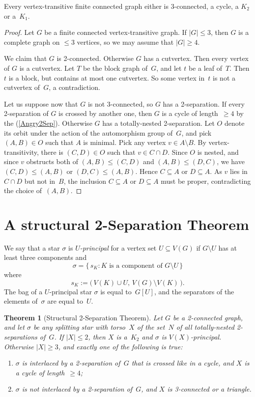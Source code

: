 \documentclass{aic}
\newcommand{\se}{\subseteq}
\theoremstyle{plain}
\newtheorem{thm}{Theorem}[section]
\theoremstyle{definition}
\theoremstyle{plain}
\theoremstyle{plain}
\newcommand{\sm}{\setminus}
\renewcommand{\le}{\leqslant}
\renewcommand{\ge}{\geqslant}
\begin{document}
\begin{cor}\cite[Theorem~3]{infiniteSPQR}\label{CayleyCase2}
Every vertex-transitive finite connected  graph either is 3-connected, a cycle, a $K_2$ or a~$K_1$.
\end{cor}
\begin{proof}
Let $G$ be a finite connected vertex-transitive graph.
If $|G|\le 3$, then $G$ is a complete graph on $\le 3$ vertices, so we may assume that $|G|\ge 4$.

We claim that $G$ is 2-connected.
Otherwise $G$ has a cutvertex.
Then every vertex of $G$ is a cutvertex.
Let $T$ be the block graph of~$G$, and let $t$ be a leaf of~$T$.
Then $t$ is a block, but contains at most one cutvertex.
So some vertex in~$t$ is not a cutvertex of~$G$, a contradiction.

Let us suppose now that $G$ is not 3-connected, so $G$ has a 2-separation.
If every 2-separation of $G$ is crossed by another one, then $G$ is a cycle of length~$\ge 4$ by the  (\ref{Angry2Sep}).
Otherwise $G$ has a totally-nested 2-separation.
Let $O$ denote its orbit under the action of the automorphism group of~$G$, and pick $(A,B)\in O$ such that $A$ is minimal.
Pick any vertex $v\in A\sm B$.
By vertex-transitivity, there is $(C,D)\in O$ such that $v\in C\cap D$.
Since $O$ is nested, and since $v$ obstructs both of $(A,B)\le (C,D)$ and $(A,B)\le (D,C)$, we have $(C,D)\le (A,B)$ or $(D,C)\le (A,B)$.
Hence $C\se A$ or $D\se A$.
As $v$ lies in $C\cap D$ but not in~$B$, the inclusion $C\se A$ or $D\se A$ must be proper, contradicting the choice of~$(A,B)$.
\end{proof}



\section{A structural 2-Separation Theorem}


We say that a star $\sigma$ is \emph{$U$-principal} for a vertex set $U\se V(G)$ if $G\sm U$ has at least three components and
\[
    \sigma=\{\,s_K\colon K\text{ is a component of }G\sm U\,\}
\]
where
\[
    s_K:=\big(\,V(K)\cup U,\,V(G)\sm V(K)\,\big).
\]
The bag of a $U$-principal star $\sigma$ is equal to~$G[U]$, and the separators of the elements of~$\sigma$ are equal to~$U$.




\begin{thm}[Structural 2-Separation Theorem]\label{2sepThm}
Let $G$ be a 2-connected graph, and let $\sigma$ be any splitting star with torso~$X$ of the set~$N$ of all totally-nested 2-separations of~$G$.
If $|X|\le 2$, then $X$ is a~$K_2$ and $\sigma$ is $V(X)$-principal.
Otherwise $|X|\ge 3$, and exactly one of the following is true:
\begin{enumerate}
    \item $\sigma$ is interlaced by a 2-separation of~$G$ that is crossed like in a cycle, and $X$ is a cycle of length~$\ge 4$;
    \item $\sigma$ is not interlaced by a 2-separation of~$G$, and $X$ is 3-connected or a triangle.
\end{enumerate}
\end{thm}
\end{document}
